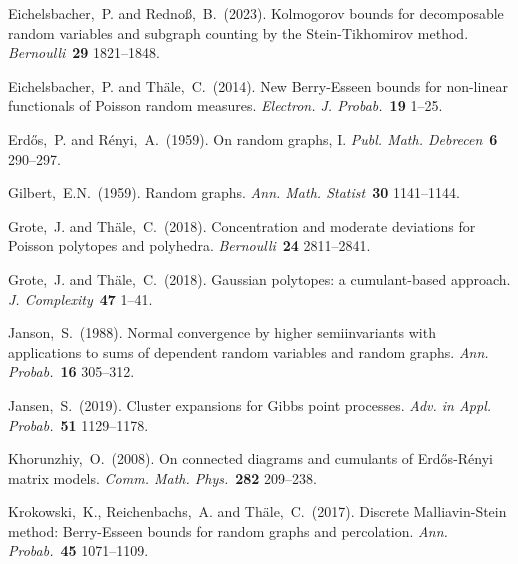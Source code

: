 \documentclass[bj,authoryear,noshowframe]{imsart}
\theoremstyle{plain}
\theoremstyle{remark}
\let\Horig\H
\begin{document}
\begin{thebibliography}{4}
  Eichelsbacher,~P. and Redno{\ss},~B.~(2023).
  Kolmogorov bounds for decomposable random variables and subgraph counting by the Stein-Tikhomirov method. \textit{Bernoulli}~\textbf{29} 1821--1848. 

  Eichelsbacher,~P. and Th{\"a}le,~C.~(2014).
  New Berry-Esseen bounds for non-linear functionals of Poisson random measures.
  \textit{Electron. J. Probab.}~\textbf{19} 1--25.

  \bibitem[\protect\citeauthoryear {Erd{\Horig{o}}s and R\'enyi}{1959}]{ER}
Erd{\Horig{o}}s,~P. and R\'enyi,~A.~(1959).
  On random graphs, {I}.
  \textit{Publ. Math. Debrecen}~\textbf{6} 290--297.

   Gilbert,~E.N.~(1959).
  Random graphs.
  \textit{Ann. Math. Statist}~\textbf{30} 1141--1144.

  Grote,~J. and Th{\"a}le,~C.~(2018).
  Concentration and moderate deviations for Poisson polytopes and polyhedra.
  \textit{Bernoulli}~\textbf{24} 2811--2841.

  Grote,~J. and Th{\"a}le,~C.~(2018).
  Gaussian polytopes: a cumulant-based approach.
  \textit{J. Complexity}~\textbf{47} 1--41.

  Janson,~S.~(1988).
  Normal convergence by higher semiinvariants with applications to sums of dependent random variables and random graphs.
  \textit{Ann. Probab.}~\textbf{16} 305--312.

  Jansen,~S.~(2019).
  Cluster expansions for Gibbs point processes.
  \textit{Adv. in Appl. Probab.}~\textbf{51} 1129--1178.

  Khorunzhiy,~O.~(2008).
  On connected diagrams and cumulants of {E}rd{\Horig{o}}s-{R}\'enyi matrix models.
  \textit{Comm. Math. Phys.}~\textbf{282} 209--238.

  Krokowski,~K., Reichenbachs,~A. and Th{\"a}le,~C.~(2017).
  Discrete Malliavin-Stein method: Berry-Esseen bounds for
    random graphs and percolation.
  \textit{Ann. Probab.}~\textbf{45} 1071--1109.


\end{thebibliography}
\end{document}

